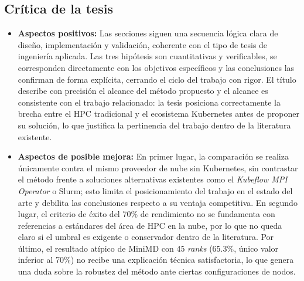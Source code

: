 \subsection{Crítica de la tesis}
\begin{itemize}
    \item \textbf{Aspectos positivos:} Las secciones siguen una secuencia lógica clara de diseño, implementación y validación, coherente con el tipo de tesis de ingeniería aplicada. Las tres hipótesis son cuantitativas y verificables, se corresponden directamente con los objetivos específicos y las conclusiones las confirman de forma explícita, cerrando el ciclo del trabajo con rigor. El título describe con precisión el alcance del método propuesto y el alcance es consistente con el trabajo relacionado: la tesis posiciona correctamente la brecha entre el HPC tradicional y el ecosistema Kubernetes antes de proponer su solución, lo que justifica la pertinencia del trabajo dentro de la literatura existente.
    \item \textbf{Aspectos de posible mejora:} En primer lugar, la comparación se realiza únicamente contra el mismo proveedor de nube sin Kubernetes, sin contrastar el método frente a soluciones alternativas existentes como el \textit{Kubeflow MPI Operator} o Slurm; esto limita el posicionamiento del trabajo en el estado del arte y debilita las conclusiones respecto a su ventaja competitiva. En segundo lugar, el criterio de éxito del 70\% de rendimiento no se fundamenta con referencias a estándares del área de HPC en la nube, por lo que no queda claro si el umbral es exigente o conservador dentro de la literatura. Por último, el resultado atípico de MiniMD con 45 \textit{ranks} (65.3\%, único valor inferior al 70\%) no recibe una explicación técnica satisfactoria, lo que genera una duda sobre la robustez del método ante ciertas configuraciones de nodos.
\end{itemize}
